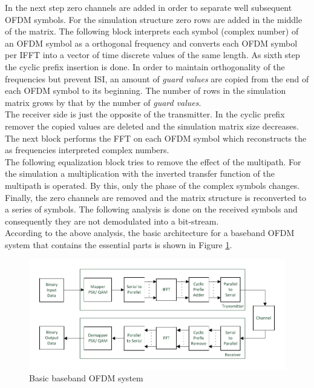 In the next step zero channels are added in order to separate well subsequent OFDM symbols. For the simulation structure zero rows are added in the middle of the matrix. The following block interprets each symbol (complex number) of an OFDM symbol as a orthogonal frequency and converts each OFDM symbol per IFFT into a vector of time discrete values of the same length. As sixth step the cyclic prefix insertion is done. In order to maintain orthogonality of the frequencies but prevent ISI, an amount of \textit{guard values} are copied from the end of each OFDM symbol to its beginning. The number of rows in the simulation matrix grows by that by the number of \textit{guard values}.\\
The receiver side is just the opposite of the transmitter. In the cyclic prefix remover the copied values are deleted and the simulation matrix size decreases. The next block performs the FFT on each OFDM symbol which reconstructs the as frequencies interpreted complex numbers.\\ The following equalization block tries to remove the effect of the multipath. For the simulation a multiplication with the inverted transfer function of the multipath is operated. By this, only the phase of the complex symbols changes.\\ 
Finally, the zero channels are removed and the matrix structure is reconverted to a series of symbols. The following analysis is done on the received symbols and consequently they are not demodulated into a bit-stream.\\
According to the above analysis, the basic architecture for a baseband OFDM system that contains the essential parts is shown in Figure \ref{fig:basic_ofdm}.\\

\begin{figure}[h!]
\centering
\includegraphics[width=\textwidth]{content/fig/basic_bb_ofdm.pdf}
\caption{Basic baseband OFDM system}
\label{fig:basic_ofdm}
\end{figure}


